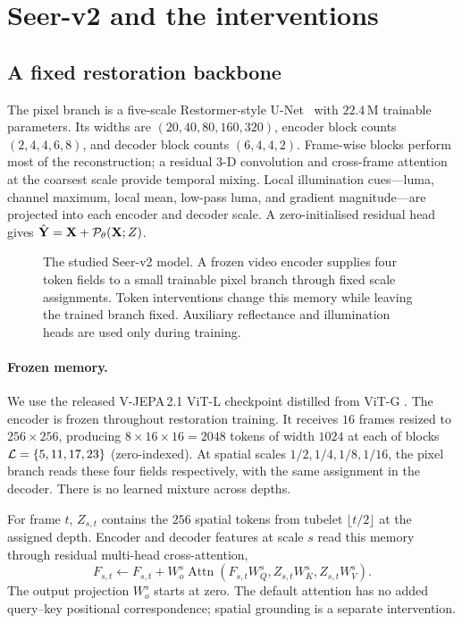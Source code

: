 \section{Seer-v2 and the interventions}\label{sec:method}

\subsection{A fixed restoration backbone}\label{sec:method:pixel}

The pixel branch is a five-scale Restormer-style U-Net~\citep{restormer}
with $22.4$\,M trainable parameters. Its widths are
$(20,40,80,160,320)$, encoder block counts $(2,4,4,6,8)$, and decoder block
counts $(6,4,4,2)$. Frame-wise blocks perform most of the reconstruction;
a residual 3-D convolution and cross-frame attention at the coarsest scale
provide temporal mixing. Local illumination cues---luma, channel maximum,
local mean, low-pass luma, and gradient magnitude---are projected into each
encoder and decoder scale.
A zero-initialised residual head gives
$\hat{\mathbf{Y}}=\mathbf{X}+\mathcal P_\theta(\mathbf{X};Z)$.

\begin{figure}[t]
\centering
\resizebox{\columnwidth}{!}{}
\caption{The studied Seer-v2 model. A frozen video encoder supplies four token
fields to a small trainable pixel branch through fixed scale assignments.
Token interventions change this memory while leaving the trained branch fixed.
Auxiliary reflectance and illumination heads are used only during training.}
\label{fig:arch}
\end{figure}

\paragraph{Frozen memory.}
We use the released V-JEPA\,2.1 ViT-L checkpoint distilled from ViT-G
\citep{vjepa2}. The encoder is frozen throughout restoration training.
It receives $16$ frames resized to $256\times256$, producing
$8\times16\times16=2048$ tokens of width $1024$ at each of blocks
$\mathcal{L}=\{5,11,17,23\}$ (zero-indexed).
At spatial scales $1/2,1/4,1/8,1/16$, the pixel branch reads these four
fields respectively, with the same assignment in the decoder.
There is no learned mixture across depths.

For frame $t$, $Z_{s,t}$ contains the $256$ spatial tokens from tubelet
$\lfloor t/2\rfloor$ at the assigned depth. Encoder and decoder features at
scale $s$ read this memory through residual multi-head cross-attention,
\begin{equation}\label{eq:xattn}
F_{s,t}\leftarrow F_{s,t}+W^s_o
  \operatorname{Attn}(F_{s,t}W^s_Q,Z_{s,t}W^s_K,Z_{s,t}W^s_V).
\end{equation}
The output projection $W^s_o$ starts at zero. The default attention has no
added query--key positional correspondence; spatial grounding is a separate
intervention.

